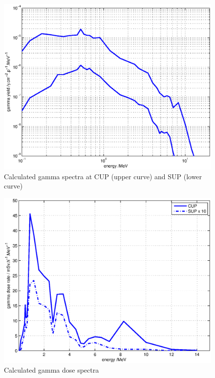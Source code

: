 \documentclass[peerreviewca,11pt,a4paper]{IEEEtran}
\let\MYoriglatexcaption\caption
\renewcommand{\caption}[2][\relax]{\MYoriglatexcaption[#2]{#2}}
\begin{document}
\begin{figure}[t]
    \centering
    \includegraphics[width=0.9\columnwidth]{gDYieldcomparedRADECS.eps}
    \caption{
        Calculated gamma spectra at CUP (upper curve) and SUP (lower curve) }
    \label{fig:DifferentialGammaSpectra}
\end{figure}

\begin{figure}[t]
    \centering
    \includegraphics[width=0.9\columnwidth]{DoseVSenergycomparedRADECS.eps}
    \caption{
        Calculated gamma dose spectra }
    \label{fig:GammaDoseEnergy}
\end{figure}
\end{document}

